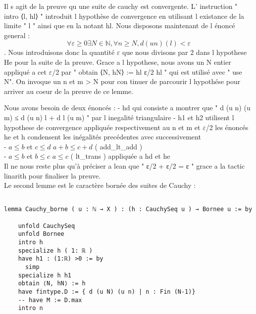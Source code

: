\documentclass[a4paper, 12pt]{article}
\begin{document}
Il s agit de la preuve qu une suite de cauchy est convergente.
L' instruction " intro ⟨l, hl⟩ "  introduit  l hypothèse de convergence en utilisant l existance de la limite  " l "  ainsi que en la notant hl.  Nous disposons maintenant de l énoncé general :  $$ \forall  \varepsilon \ge 0 \exists N \in \mathbb{N},\forall n \geq N, d (u n) ( l ) < \varepsilon$$  . Nous introduisons donc la  quantité $\varepsilon$ que nous divisons par 2 dans l hypothese He pour la suite de la preuve. 
Grace a l hypothese, nous avons un N entier appliqué a cet  $\varepsilon$/2  par " obtain ⟨N, hN⟩ := hl ε/2 hl "
 qui est utilisé avec " use N". 
 On invoque un n et m > N pour con
 tinuer de parcourir l hypothése pour arriver au coeur de la preuve de ce lemme.

 Nous avons besoin de deux énoncés :
                - hd qui consiste a montrer que " d (u n) (u m) ≤ d (u n) l + d l (u m) " par l inegalité triangulaire
                -  h1 et h2 utilisent l hypothese de convergence appliquée respectivement au n et m et $\varepsilon$/2
    les énoncés he et h condensent les inégalités precédentes avec successivement \\
        - $a \leq b $ et $ c\leq d$ \implies $ a+b \leq c+d$ ( add_lt_add )  \\ 
        - $a \leq b $ et $ b \leq c $ \implies $ a\leq c$ ( lt_trans )  appliquée a hd et he\\ 

Il ne nous reste plus qu'à préciser a lean que  " ε/2 + ε/2 = ε " grace a la tactic linarith pour finaliser la preuve. \\ 


Le second lemme est le caractère bornée des suites de Cauchy :

\begin{verbatim}

lemma Cauchy_borne ( u : ℕ → X ) : (h : CauchySeq u ) → Bornee u := by

    unfold CauchySeq
    unfold Bornee
    intro h
    specialize h ( 1: ℝ )
    have h1 : (1:ℝ) >0 := by
      simp
    specialize h h1
    obtain ⟨N, hN⟩ := h
    have fintype.D := { d (u N) (u n) | n : Fin (N-1)} 
    -- have M := D.max
    intro n
    
\end{verbatim}
\end{document}
